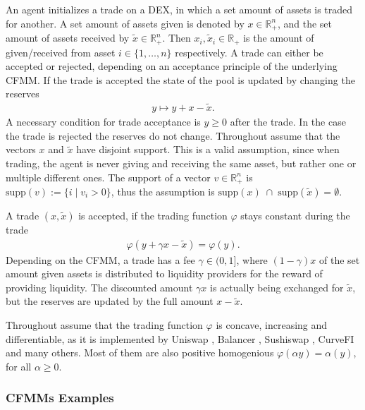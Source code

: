An agent initializes a trade on a DEX, in which a set amount of assets is
traded for another. A set amount of assets given is denoted by $x \in
\mathbb{R}^{n}_+$, and the set amount of assets received by $\tilde{x} \in
\mathbb{R}^{n}_+$. Then $x_i, \tilde{x}_i \in \mathbb{R}_+$ is the amount of
given/received from asset $i \in \{1,\ldots,n\}$ respectively. A trade can either be
accepted or rejected, depending on an acceptance principle of the underlying
CFMM. If the trade is accepted the state of the pool is updated by changing
the reserves
\begin{align}
    y \mapsto y + x - \tilde{x}.
\end{align}
A necessary condition for trade acceptance is $y \ge 0$ after the trade. In
the case the trade is rejected the reserves do not change. Throughout
assume that the vectors $x$ and $\tilde{x}$ have disjoint support. This
is a valid assumption, since when trading, the agent is never giving and receiving
the same asset, but rather one or multiple different ones. The
support of a vector $v \in \mathbb{R}^{n}_+$ is $\text{supp}(v) := \{i\; |\;
v_i > 0\}$, thus the assumption is $\text{supp}(x)\;\cap\;
\text{supp}(\tilde{x}) = \emptyset$.

A trade $(x, \tilde{x})$ is accepted, if the trading function $\varphi$
stays constant during the trade
\begin{align}
    \varphi(y+\gamma x - \tilde{x}) = \varphi(y).
\end{align}
Depending on the CFMM, a trade has a fee $\gamma \in (0, 1]$, where
$(1-\gamma)x$ of the set amount given assets is distributed to liquidity
providers for the reward of providing liquidity. The discounted amount
$\gamma x$ is actually being exchanged for $\tilde{x}$, but the reserves are
updated by the full amount $x - \tilde{x}$.

Throughout assume that the trading function $\varphi$ is concave,
increasing and differentiable, as it is implemented by Uniswap
\cite{uniswap}, Balancer \cite{balancer}, Sushiswap \cite{sushiswap}, CurveFI
\cite{curvefi} and many others. Most of them are also positive homogenious
$\varphi(\alpha y)=\alpha(y)$, for all $\alpha \ge 0$.
\subsubsection{CFMMs Examples}

